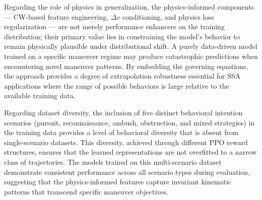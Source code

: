 \documentclass[a4paper,fleqn]{cas-dc}
\begin{document}
Regarding the role of physics in generalization, the physics-informed components --- CW-based feature engineering, $\Delta v$ conditioning, and physics loss regularization --- are not merely performance enhancers on the training distribution; their primary value lies in constraining the model's behavior to remain physically plausible under distributional shift. A purely data-driven model trained on a specific maneuver regime may produce catastrophic predictions when encountering novel maneuver patterns. By embedding the governing equations, the approach provides a degree of extrapolation robustness essential for SSA applications where the range of possible behaviors is large relative to the available training data.

Regarding dataset diversity, the inclusion of five distinct behavioral intention scenarios (pursuit, reconnaissance, ambush, obstruction, and mixed strategies) in the training data provides a level of behavioral diversity that is absent from single-scenario datasets. This diversity, achieved through different PPO reward structures, ensures that the learned representations are not overfitted to a narrow class of trajectories. The models trained on this multi-scenario dataset demonstrate consistent performance across all scenario types during evaluation, suggesting that the physics-informed features capture invariant kinematic patterns that transcend specific maneuver objectives.
\end{document}
